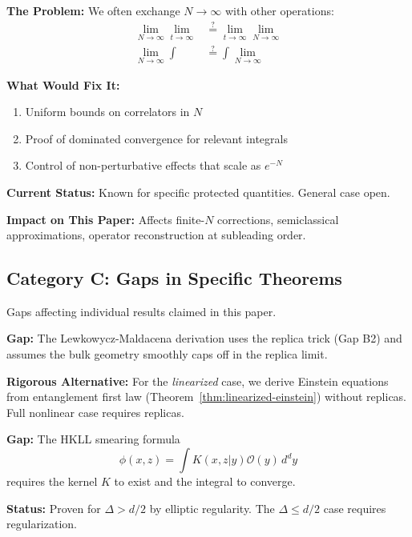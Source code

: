\documentclass[12pt,a4paper]{article}
\begin{document}
\begin{gapbox}[title={Gap B3: Large-$N$ Interchange of Limits}]
\textbf{The Problem:} We often exchange $N \to \infty$ with other operations:
\begin{align}
\lim_{N \to \infty} \lim_{t \to \infty} &\stackrel{?}{=} \lim_{t \to \infty} \lim_{N \to \infty} \\
\lim_{N \to \infty} \int &\stackrel{?}{=} \int \lim_{N \to \infty}
\end{align}

\textbf{What Would Fix It:}
\begin{enumerate}
    \item Uniform bounds on correlators in $N$
    \item Proof of dominated convergence for relevant integrals
    \item Control of non-perturbative effects that scale as $e^{-N}$
\end{enumerate}

\textbf{Current Status:} Known for specific protected quantities. General case open.

\textbf{Impact on This Paper:} Affects finite-$N$ corrections, semiclassical approximations, operator reconstruction at subleading order.
\end{gapbox}

\subsection{Category C: Gaps in Specific Theorems}

Gaps affecting individual results claimed in this paper.

\begin{gapbox}[title={Gap C1: RT Formula Derivation (Theorem~\ref{thm:spectral-reconstruction})}]
\textbf{Gap:} The Lewkowycz-Maldacena derivation uses the replica trick (Gap B2) and assumes the bulk geometry smoothly caps off in the replica limit.

\textbf{Rigorous Alternative:} For the \emph{linearized} case, we derive Einstein equations from entanglement first law (Theorem~\ref{thm:linearized-einstein}) without replicas. Full nonlinear case requires replicas.
\end{gapbox}

\begin{gapbox}[title={Gap C2: HKLL Reconstruction Convergence}]
\textbf{Gap:} The HKLL smearing formula
\[
\phi(x,z) = \int K(x,z|y) \mathcal{O}(y) \, d^dy
\]
requires the kernel $K$ to exist and the integral to converge.

\textbf{Status:} Proven for $\Delta > d/2$ by elliptic regularity. The $\Delta \leq d/2$ case requires regularization.
\end{gapbox}
\end{document}
